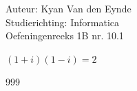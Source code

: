 \documentclass[a4paper]{article}
\begin{document}
  
\noindent \large Auteur: Kyan Van den Eynde \\
\noindent \large Studierichting: Informatica\\
\noindent \large Oefeningenreeks 1B nr. 10.1\\

\medskip

\normalsize

$(1+i)(1-i) = 2$\\

\begin{thebibliography}{999}
\end{thebibliography}
\end{document}
